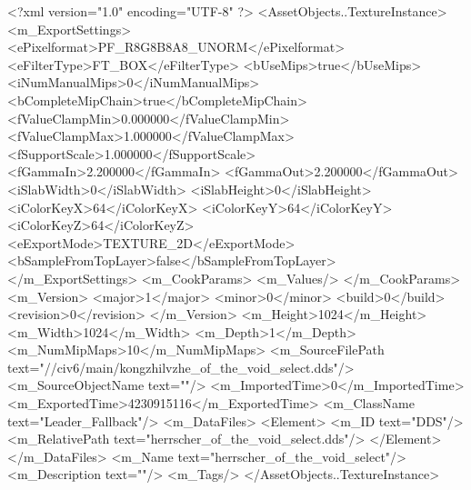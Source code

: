 <?xml version="1.0" encoding="UTF-8" ?>
<AssetObjects..TextureInstance>
	<m_ExportSettings>
		<ePixelformat>PF_R8G8B8A8_UNORM</ePixelformat>
		<eFilterType>FT_BOX</eFilterType>
		<bUseMips>true</bUseMips>
		<iNumManualMips>0</iNumManualMips>
		<bCompleteMipChain>true</bCompleteMipChain>
		<fValueClampMin>0.000000</fValueClampMin>
		<fValueClampMax>1.000000</fValueClampMax>
		<fSupportScale>1.000000</fSupportScale>
		<fGammaIn>2.200000</fGammaIn>
		<fGammaOut>2.200000</fGammaOut>
		<iSlabWidth>0</iSlabWidth>
		<iSlabHeight>0</iSlabHeight>
		<iColorKeyX>64</iColorKeyX>
		<iColorKeyY>64</iColorKeyY>
		<iColorKeyZ>64</iColorKeyZ>
		<eExportMode>TEXTURE_2D</eExportMode>
		<bSampleFromTopLayer>false</bSampleFromTopLayer>
	</m_ExportSettings>
	<m_CookParams>
		<m_Values/>
	</m_CookParams>
	<m_Version>
		<major>1</major>
		<minor>0</minor>
		<build>0</build>
		<revision>0</revision>
	</m_Version>
	<m_Height>1024</m_Height>
	<m_Width>1024</m_Width>
	<m_Depth>1</m_Depth>
	<m_NumMipMaps>10</m_NumMipMaps>
	<m_SourceFilePath text="//civ6/main/kongzhilvzhe\Texture\herrscher_of_the_void_select.dds"/>
	<m_SourceObjectName text=""/>
	<m_ImportedTime>0</m_ImportedTime>
	<m_ExportedTime>4230915116</m_ExportedTime>
	<m_ClassName text="Leader_Fallback"/>
	<m_DataFiles>
		<Element>
			<m_ID text="DDS"/>
			<m_RelativePath text="herrscher_of_the_void_select.dds"/>
		</Element>
	</m_DataFiles>
	<m_Name text="herrscher_of_the_void_select"/>
	<m_Description text=""/>
	<m_Tags/>
</AssetObjects..TextureInstance>

